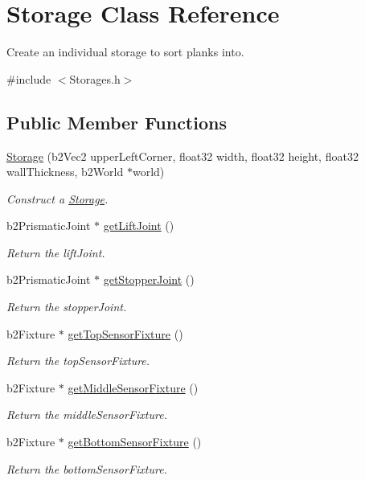 \hypertarget{classStorage}{\section{Storage Class Reference}
\label{classStorage}
}


Create an individual storage to sort planks into.  




{\ttfamily \#include $<$Storages.\-h$>$}

\subsection*{Public Member Functions}
\begin{DoxyCompactItemize}
\item 
\hyperlink{classStorage_a65c2cbe07917448e17db98e7a1661cea}{Storage} (b2\-Vec2 upper\-Left\-Corner, float32 width, float32 height, float32 wall\-Thickness, b2\-World $\ast$world)
\begin{DoxyCompactList}\small\item\em Construct a \hyperlink{classStorage}{Storage}. \end{DoxyCompactList}\item 
b2\-Prismatic\-Joint $\ast$ \hyperlink{classStorage_a1c5c79f11fa271b28e0ac22ea0649c40}{get\-Lift\-Joint} ()
\begin{DoxyCompactList}\small\item\em Return the lift\-Joint. \end{DoxyCompactList}\item 
b2\-Prismatic\-Joint $\ast$ \hyperlink{classStorage_a6e36f363dae08cf2f4b308b1e0a1e1bd}{get\-Stopper\-Joint} ()
\begin{DoxyCompactList}\small\item\em Return the stopper\-Joint. \end{DoxyCompactList}\item 
b2\-Fixture $\ast$ \hyperlink{classStorage_a585cdae218715a238dfc4277f875df60}{get\-Top\-Sensor\-Fixture} ()
\begin{DoxyCompactList}\small\item\em Return the top\-Sensor\-Fixture. \end{DoxyCompactList}\item 
b2\-Fixture $\ast$ \hyperlink{classStorage_ad22d8f7e6c28ba888bf7abd016e9ec38}{get\-Middle\-Sensor\-Fixture} ()
\begin{DoxyCompactList}\small\item\em Return the middle\-Sensor\-Fixture. \end{DoxyCompactList}\item 
b2\-Fixture $\ast$ \hyperlink{classStorage_a02014b1514942bedd63a7e2456982f39}{get\-Bottom\-Sensor\-Fixture} ()
\begin{DoxyCompactList}\small\item\em Return the bottom\-Sensor\-Fixture. \end{DoxyCompactList}\end{DoxyCompactItemize}
